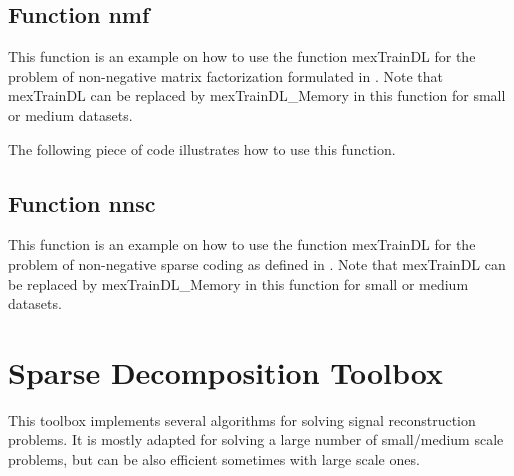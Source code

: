 \documentclass[a4paper, 11pt]{article}
\begin{document}
\subsection{Function nmf}
This function is an example on how to use the function mexTrainDL for the
problem of non-negative matrix factorization formulated in \cite{lee2}.  Note
that mexTrainDL can be replaced by mexTrainDL\_Memory in this function for
small or medium datasets.

%    

The following piece of code illustrates how to use this function.


\subsection{Function nnsc}
This function is an example on how to use the function mexTrainDL for the
problem of non-negative sparse coding as defined in \cite{hoyer}.  Note that
mexTrainDL can be replaced by mexTrainDL\_Memory in this function for small or
medium datasets.

%    

% 



\section{Sparse Decomposition Toolbox}
This toolbox implements several algorithms for solving signal reconstruction problems. It is mostly adapted for solving a large number of small/medium scale problems, but can be also efficient sometimes with large scale ones.
\end{document}
